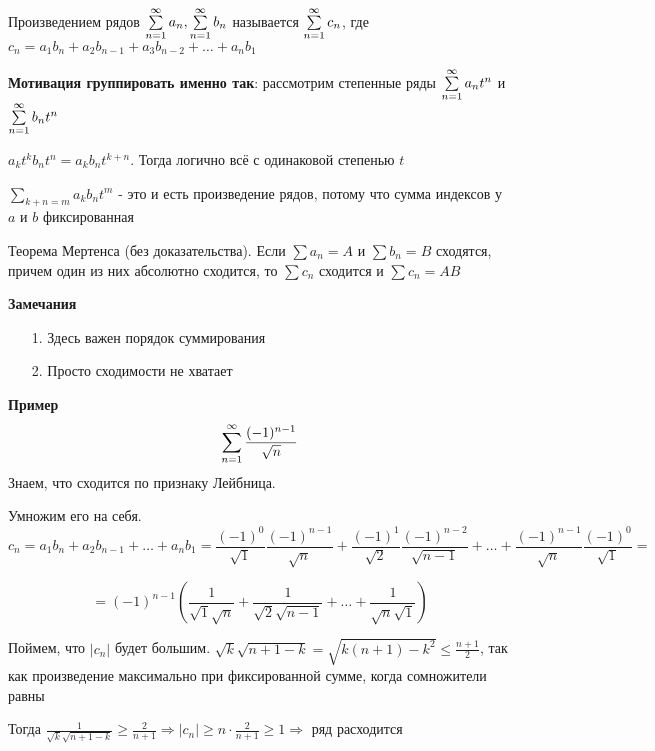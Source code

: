 \begin{conj}
    Произведением рядов $\sum \limits_{n=1}^\infty a_n, \sum \limits_{n=1}^\infty b_n$ называется $\sum \limits_{n=1}^\infty c_n$, где $c_n = a_1b_n + a_2b_{n-1}+a_3b_{n-2} + \ldots + a_nb_1$
\end{conj}

\textbf{Мотивация группировать именно так}: рассмотрим степенные ряды $\sum \limits_{n=1}^\infty a_nt^n$ и $\sum \limits_{n=1}^\infty b_nt^n$

$a_kt^k b_nt^n = a_kb_n t^{k+n}$. Тогда логично всё с одинаковой степенью $t$

$\sum_{k+n = m}a_kb_n t^m$ - это и есть произведение рядов, потому что сумма индексов у $a$ и $b$ фиксированная

\begin{theorem}
    Теорема Мертенса (без доказательства). Если $\sum a_n = A$ и $\sum b_n = B$ сходятся, 
    причем один из них абсолютно сходится, то $\sum c_n$ сходится и $\sum c_n = AB$
\end{theorem}

\textbf{Замечания}
\begin{enumerate}
    \item[1.] Здесь важен порядок суммирования
    \item[2.] Просто сходимости не хватает 
\end{enumerate}

\textbf{Пример}
\begin{equation*}
    \sum \limits_{n=1}^\infty \frac{(-1)^{n-1}}{\sqrt{n}}
\end{equation*}
Знаем, что сходится по признаку Лейбница.

Умножим его на себя. 
\begin{equation*}
    c_n = a_1b_n + a_2b_{n-1} + \ldots + a_nb_1 = 
    \frac{(-1)^0}{\sqrt{1}} \frac{(-1)^{n-1}}{\sqrt{n}} + 
    \frac{(-1)^1}{\sqrt{2}}\frac{(-1)^{n-2}}{\sqrt{n-1}} + \ldots +
    \frac{(-1)^{n-1}}{\sqrt{n}}\frac{(-1)^0}{\sqrt{1}} = 
\end{equation*}

\begin{equation*}
    = (-1)^{n-1}
    (\frac{1}{\sqrt{1}\sqrt{n}} + \frac{1}{\sqrt{2}\sqrt{n-1}} + \ldots + \frac{1}{\sqrt{n}\sqrt{1}})
\end{equation*}

Поймем, что $|c_n|$ будет большим. $\sqrt{k}\sqrt{n+1-k} = \sqrt{k(n+1)-k^2} \leq \frac{n+1}{2}$, 
так как произведение максимально при фиксированной сумме, когда сомножители равны

Тогда $\frac{1}{\sqrt{k}\sqrt{n+1-k}} \geq \frac{2}{n+1}
\Rightarrow |c_n| \geq n \cdot \frac{2}{n+1} \geq 1 \Rightarrow$ ряд расходится

